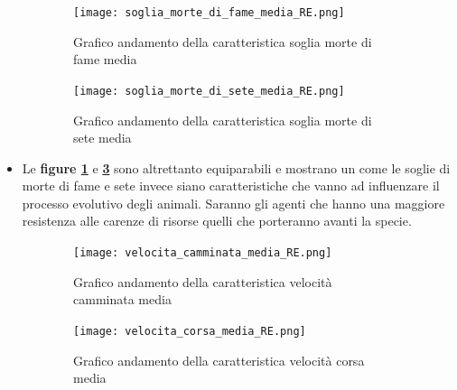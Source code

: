 \documentclass[11pt]{article}
\begin{document}
\newpage 

\begin{figure}[ht!]
	\hspace{-2mm}
	\begin{subfigure}{\textwidth}
         \centering
         \texttt{[image: soglia\_morte\_di\_fame\_media\_RE.png]}
         \caption{Grafico andamento della caratteristica soglia morte di fame media}
         \label{fig:morteFameRE}
	\end{subfigure}
	\begin{subfigure}{\textwidth}
		\centering
        \texttt{[image: soglia\_morte\_di\_sete\_media\_RE.png]}
        \caption{Grafico andamento della caratteristica soglia morte di sete media}
        \label{fig:morteSeteRE}
	\end{subfigure}
	\caption{}
\end{figure}



\begin{itemize}


    \item Le \textbf{figure \ref{fig:morteFameRE}} e \textbf{\ref{fig:morteSeteRE}} sono altrettanto equiparabili e mostrano un come le soglie di morte di fame e sete invece siano caratteristiche che vanno ad influenzare il processo evolutivo degli animali. Saranno gli agenti che hanno una maggiore resistenza alle carenze di risorse quelli che porteranno avanti la specie. 
    
\end{itemize}

\newpage 

\begin{figure}[ht!]
	\begin{subfigure}{\textwidth}
         \centering
         \texttt{[image: velocita\_camminata\_media\_RE.png]}
         \caption{Grafico andamento della caratteristica velocità camminata media}
         \label{fig:camminataRE}
	\end{subfigure}
	\begin{subfigure}{\textwidth}
		\centering
        \texttt{[image: velocita\_corsa\_media\_RE.png]}
        \caption{Grafico andamento della caratteristica velocità corsa media}
        \label{fig:corsaRE}
	\end{subfigure}
\caption{}
\end{figure}
\end{document}
